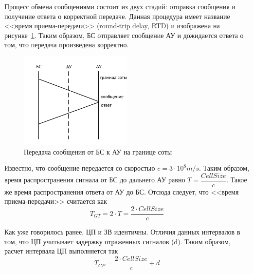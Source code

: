Процесс обмена сообщениями состоит из двух стадий: отправка сообщения и получение ответа
о корректной передаче.
Данная процедура имеет название <<время приема-передачи>> (round-trip delay, RTD) и изображена на
рисунке~\ref{fig:vol_calc_CP}. Таким образом, БС отправляет сообщение АУ и дожидается ответа о том,
что передача произведена корректно.
\begin{figure}[H]
    \centering
    \includegraphics[width=0.5\textwidth]{img/vol_calc_CP}
    \caption{Передача сообщения от БС к АУ на границе соты}
    \label{fig:vol_calc_CP}
\end{figure}

Известно, что сообщение передается со скоростью \(c = 3 \cdot 10^{8} m/s\). Таким образом, время распространения сигнала от БС до дальнего АУ равно \(T = \dfrac{Cell Size}{c}\). Такое же время
распространения ответа от АУ до БС. Отсюда следует, что <<время приема-передачи>> считается как
\[T_{GT} = 2 \cdot T = \dfrac{2 \cdot Cell Size}{c}\]

Как уже говорилось ранее, ЦП и ЗВ идентичны. Отличия данных интервалов в том, что ЦП учитывает
задержку отраженных сигналов (d). Таким образом, расчет интервала ЦП выполняется так
\[T_{CP} = \dfrac{2 \cdot Cell Size}{c} + d\]
\newpage